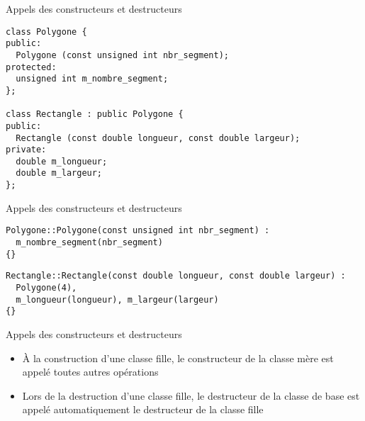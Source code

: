 \documentclass[c]{beamer}
\begin{document}
\begin{frame}[fragile,label={sec:orgheadline5}]{Appels des constructeurs et destructeurs}
 \begin{verbatim}
class Polygone {
public:
  Polygone (const unsigned int nbr_segment);
protected:
  unsigned int m_nombre_segment;
};

class Rectangle : public Polygone {
public:
  Rectangle (const double longueur, const double largeur);
private:
  double m_longueur;
  double m_largeur;
};
\end{verbatim}
\end{frame}


\begin{frame}[fragile]{Appels des constructeurs et destructeurs}
 \begin{verbatim}
Polygone::Polygone(const unsigned int nbr_segment) :
  m_nombre_segment(nbr_segment)
{}

\end{verbatim}
\pause
\begin{verbatim}
Rectangle::Rectangle(const double longueur, const double largeur) :
  Polygone(4),
  m_longueur(longueur), m_largeur(largeur)
{}
\end{verbatim}
\pause
{}
\end{frame}



\begin{frame}[fragile]{Appels des constructeurs et destructeurs}
\begin{itemize}
\item À la construction d'une classe fille, le constructeur de la classe mère est
appelé  toutes autres opérations

\item Lors de la destruction d'une classe fille, le destructeur de la classe de base
est appelé automatiquement  le destructeur de la classe fille
\end{itemize}
\end{frame}
\end{document}
